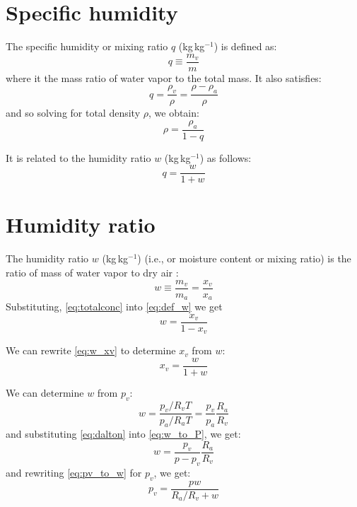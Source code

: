 \section*{Specific humidity}

The specific humidity or mixing ratio $q$ (kg\,kg$^{-1}$) is defined as:
\begin{equation}
q \equiv \frac{m_v}{m}
\label{eq:def_q}
\end{equation}
where it the mass ratio of water vapor to the total mass. It also satisfies:
\begin{equation}
q = \frac{\rho_v}{\rho} = \frac{\rho - \rho_a}{\rho}
\label{eq:q_rho}
\end{equation}
and so solving for total density $\rho$, we obtain:
\begin{equation}
\rho = \frac{\rho_a}{1-q}
\label{eq:q_rho2}
\end{equation}

It is related to the humidity ratio $w$ (kg\,kg$^{-1}$) as follows:
\begin{equation}
q = \frac{w}{1 + w}
\label{eq:q_w}
\end{equation}

\section*{Humidity ratio}

The humidity ratio $w$ (kg\,kg$^{-1}$) (i.e., or moisture content or mixing ratio) is the ratio of mass of water vapor to dry air \citep{ASHRAE2013}:
\begin{equation}
w \equiv \frac{m_v}{m_a} = \frac{x_v}{x_a}
\label{eq:def_w}
\end{equation}
Substituting, \ref{eq:totalconc} into \ref{eq:def_w} we get
\begin{equation}
w = \frac{x_v}{1 - x_v}
\label{eq:w_xv}
\end{equation}

We can rewrite \ref{eq:w_xv} to determine $x_v$ from $w$:
\begin{equation}
x_v = \frac{w}{1 + w}
\label{eq:xv_w}
\end{equation}

We can determine $w$ from $p_v$:
\begin{equation}
w = \frac{p_v/R_v T}{p_a/ R_aT} = \frac{p_v}{p_a}\frac{R_a}{R_v}
\label{eq:w_to_P}
\end{equation}
and substituting \ref{eq:dalton} into \ref{eq:w_to_P}, we get:
\begin{equation}
w = \frac{p_v}{p-p_v}\frac{R_a}{R_v}
\label{eq:pv_to_w}
\end{equation}
and rewriting \ref{eq:pv_to_w} for $p_v$, we get:
\begin{equation}
p_v = \frac{p w}{R_a/R_v+w}
\label{eq:w_to_pv}
\end{equation}

